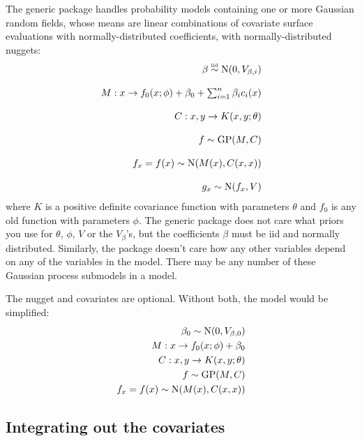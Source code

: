 The generic package handles probability models containing one or more Gaussian random fields, whose means are linear combinations of covariate surface evaluations with normally-distributed coefficients, with normally-distributed nuggets:
\begin{equation}
    \label{eq:canonical} 
    \begin{array}{r}
        \beta \stackrel{\textup{\tiny iid}}{\sim} \textup{N}(0,V_{\beta,i}) \\\\
        M:x\rightarrow f_0(x;\phi) + \beta_0 + \sum_{i=1}^n \beta_i c_i(x)\\\\
        C:x,y\rightarrow K(x,y;\theta)\\\\
        f \sim \textup{GP}(M,C)\\\\
        f_x = f(x) \sim \textup{N}(M(x), C(x,x))\\\\
        g_x \sim \textup{N}(f_x, V) 
    \end{array}
\end{equation}
where $K$ is a positive definite covariance function with parameters $\theta$ and $f_0$ is any old function with parameters $\phi$. The generic package does not care what priors you use for $\theta$, $\phi$, $V$ or the $V_\beta$'s, but the coefficients $\beta$ must be iid and normally distributed. Similarly, the package doesn't care how any other variables depend on any of the variables in the model. There may be any number of these Gaussian process submodels in a model.

The nugget and covariates are optional. Without both, the model would be simplified:
\begin{eqnarray*}
    \beta_0\sim\textup{N}(0,V_{\beta,0})\\
    M:x\rightarrow f_0(x;\phi) + \beta_0\\
    C:x,y\rightarrow K(x,y;\theta)\\
    f \sim \textup{GP}(M,C)\\
    f_x = f(x) \sim \textup{N}(M(x), C(x,x))
\end{eqnarray*}

\subsection{Integrating out the covariates}

